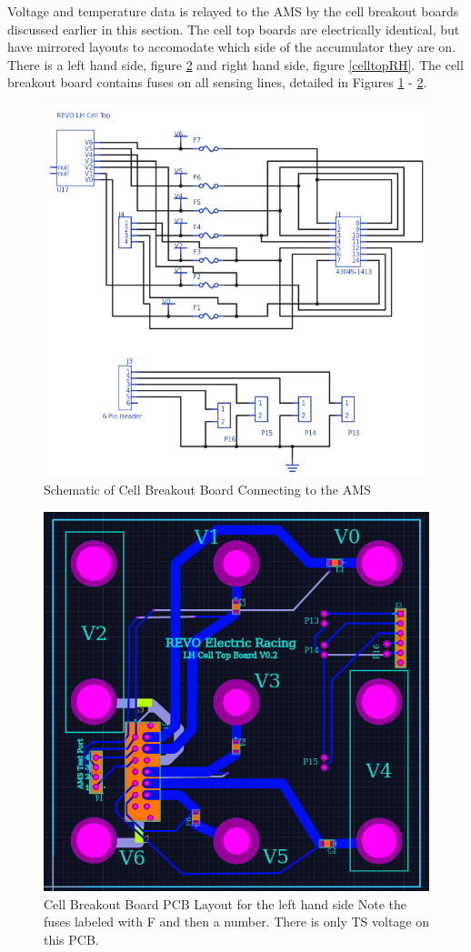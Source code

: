 \documentclass{article}
\begin{document}
             Voltage and temperature data is relayed to the AMS by the cell breakout boards discussed earlier in this section. The cell top boards are electrically identical, but have mirrored layouts to accomodate which side of the accumulator they are on. There is a left hand side, figure \ref{celltopLH} and right hand side, figure \ref{celltopRH}. The cell breakout board contains fuses on all sensing lines, detailed in Figures \ref{celltopschem} - \ref{celltopLH}.
              \begin{figure}[H]
                  \centering
                  \includegraphics[width = 0.8 \textwidth]{CellTopSchem}
                  \caption{Schematic of Cell Breakout Board Connecting to the AMS}
                  \label{celltopschem}
              \end{figure}
              \begin{figure}[H]
                  \centering
                  \includegraphics[width = 0.4 \textwidth]{CellTopLH}
                  \caption{Cell Breakout Board PCB Layout for the left hand side Note the fuses labeled with F and then a number. There is only TS voltage on this PCB.}
                  \label{celltopLH}
              \end{figure}
\end{document}
